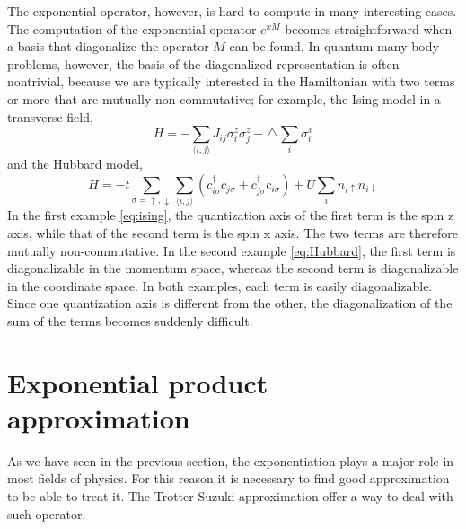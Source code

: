The exponential operator, however, is hard to compute in many interesting cases. The computation of the exponential operator $e^{xM}$ becomes straightforward when a basis that diagonalize the operator $M$ can be found. In quantum many-body problems, however, the basis of the diagonalized representation is often nontrivial, because we are typically interested in the Hamiltonian with two terms or more that are mutually non-commutative; for example, the Ising model in a transverse field,
\begin{equation} \label{eq:ising}
H = -\sum_{\langle i,j \rangle} J_{ij} \sigma_i^z \sigma_j^z - \triangle\sum_i \sigma_i^x
\end{equation}
and the Hubbard model,
\begin{equation} \label{eq:Hubbard}
H = -t \sum_{\sigma = \uparrow ,\downarrow} \sum_{\langle i,j \rangle} (c_{i\sigma}^\dagger c_{j\sigma} + c_{j\sigma}^\dagger c_{i\sigma}) + U\sum_i n_{i\uparrow} n_{i\downarrow}
\end{equation}
In the first example \eqref{eq:ising}, the quantization axis of the first term is the spin z axis, while that of the second term is the spin x axis. The two terms are therefore mutually non-commutative. In the second example \eqref{eq:Hubbard}, the first term is diagonalizable in the momentum space, whereas the second term is diagonalizable in the coordinate space. In both examples, each term is easily diagonalizable. Since one quantization axis is different from the other, the diagonalization of the sum of the terms becomes suddenly difficult.

\section{Exponential product approximation}

As we have seen in the previous section, the exponentiation plays a major role in most fields of physics. For this reason it is necessary to find good approximation to be able to treat it. The Trotter-Suzuki approximation offer a way to deal with such operator. 

